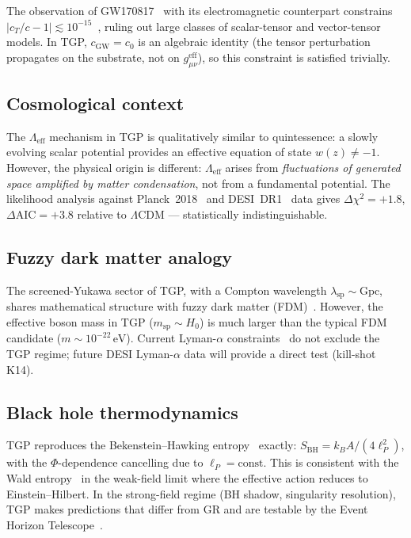The observation of GW170817~\cite{GW170817} with its
electromagnetic counterpart constrains $|c_{T}/c-1|
\lesssim 10^{-15}$~\cite{Baker2017}, ruling out large classes
of scalar-tensor and vector-tensor models.  In TGP,
$c_{\mathrm{GW}}=c_{0}$ is an algebraic identity (the tensor
perturbation propagates on the substrate, not on $g_{\mu\nu}^{\mathrm{eff}}$),
so this constraint is satisfied trivially.

\subsection{Cosmological context}

The $\Lambda_{\mathrm{eff}}$ mechanism in TGP is qualitatively
similar to quintessence: a slowly evolving scalar potential
provides an effective equation of state $w(z)\neq -1$.
However, the physical origin is different: $\Lambda_{\mathrm{eff}}$
arises from \emph{fluctuations of generated space amplified
by matter condensation}, not from a fundamental potential.
The likelihood analysis against Planck~2018~\cite{Planck2018VI}
and DESI~DR1~\cite{DESI2024} data gives
$\Delta\chi^{2}=+1.8$, $\Delta\mathrm{AIC}=+3.8$ relative
to $\Lambda$CDM --- statistically indistinguishable.

\subsection{Fuzzy dark matter analogy}

The screened-Yukawa sector of TGP, with a Compton wavelength
$\lambda_{\mathrm{sp}}\sim\mathrm{Gpc}$, shares mathematical
structure with fuzzy dark matter
(FDM)~\cite{Hu2000,Schive2014}.  However, the effective boson
mass in TGP ($m_{\mathrm{sp}}\sim H_{0}$) is much larger
than the typical FDM candidate ($m\sim 10^{-22}\,\mathrm{eV}$).
Current Lyman-$\alpha$ constraints~\cite{Irsic2017,Rogers2021}
do not exclude the TGP regime; future DESI Lyman-$\alpha$ data
will provide a direct test (kill-shot K14).

\subsection{Black hole thermodynamics}

TGP reproduces the Bekenstein--Hawking
entropy~\cite{Bekenstein1973,Hawking1975} exactly:
$S_{\mathrm{BH}}=k_{B}A/(4\ell_{P}^{2})$, with the
$\Phi$-dependence cancelling due to
$\ell_{P}=\mathrm{const}$.  This is consistent with the
Wald entropy~\cite{Wald1993} in the weak-field limit where
the effective action reduces to Einstein--Hilbert.
In the strong-field regime (BH shadow, singularity
resolution), TGP makes predictions that differ from GR
and are testable by the Event Horizon
Telescope~\cite{EHT-M87-2019,EHT-SgrA-2022}.

